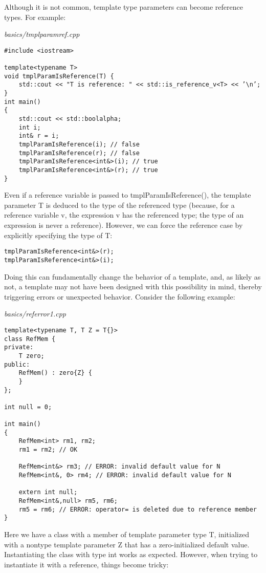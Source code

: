 Although it is not common, template type parameters can become reference types. For example:

\noindent
\textit{basics/tmplparamref.cpp}
\begin{lstlisting}[style=styleCXX]
#include <iostream>

template<typename T>
void tmplParamIsReference(T) {
	std::cout << "T is reference: " << std::is_reference_v<T> << ’\n’;
}
int main()
{
	std::cout << std::boolalpha;
	int i;
	int& r = i;
	tmplParamIsReference(i); // false
	tmplParamIsReference(r); // false
	tmplParamIsReference<int&>(i); // true
	tmplParamIsReference<int&>(r); // true
}
\end{lstlisting}

Even if a reference variable is passed to tmplParamIsReference(), the template parameter T is deduced to the type of the referenced type (because, for a reference variable v, the expression v has the referenced type; the type of an expression is never a reference). However, we can force the reference case by explicitly specifying the type of T:

\begin{lstlisting}[style=styleCXX]
tmplParamIsReference<int&>(r);
tmplParamIsReference<int&>(i);
\end{lstlisting}

Doing this can fundamentally change the behavior of a template, and, as likely as not, a template may not have been designed with this possibility in mind, thereby triggering errors or unexpected behavior. Consider the following example:

\noindent
\textit{basics/referror1.cpp}
\begin{lstlisting}[style=styleCXX]
template<typename T, T Z = T{}>
class RefMem {
private:
	T zero;
public:
	RefMem() : zero{Z} {
	}
};

int null = 0;

int main()
{
	RefMem<int> rm1, rm2;
	rm1 = rm2; // OK
	
	RefMem<int&> rm3; // ERROR: invalid default value for N
	RefMem<int&, 0> rm4; // ERROR: invalid default value for N
	
	extern int null;
	RefMem<int&,null> rm5, rm6;
	rm5 = rm6; // ERROR: operator= is deleted due to reference member
}
\end{lstlisting}

Here we have a class with a member of template parameter type T, initialized with a nontype template parameter Z that has a zero-initialized default value. Instantiating the class with type int works as expected. However, when trying to instantiate it with a reference, things become tricky:

